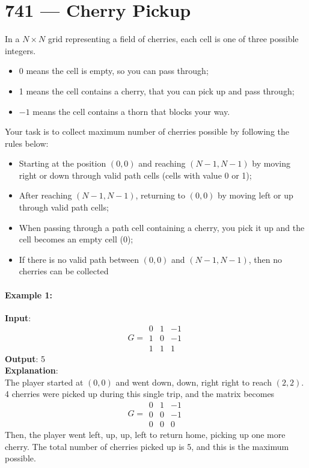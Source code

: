 \section{741 --- Cherry Pickup}
In a $N \times N$ grid representing a field of cherries, each cell is one of three possible integers.
\begin{itemize}
    \item 0 means the cell is empty, so you can pass through;
    \item 1 means the cell contains a cherry, that you can pick up and pass through;
    \item $-1$ means the cell contains a thorn that blocks your way.
\end{itemize}
Your task is to collect maximum number of cherries possible by following the rules below:
\begin{itemize}
    \item Starting at the position $(0, 0)$ and reaching $(N-1, N-1)$ by moving right or down through valid path cells (cells with value 0 or 1);
    \item After reaching $(N-1, N-1)$, returning to $(0, 0)$ by moving left or up through valid path cells;
    \item When passing through a path cell containing a cherry, you pick it up and the cell becomes an empty cell (0);
    \item If there is no valid path between $(0, 0)$ and $(N-1, N-1)$, then no cherries can be collected
\end{itemize}
\paragraph{Example 1:}
\begin{flushleft}
\textbf{Input}:
\[
G = \begin{array}{rrr}
0 & 1 &  -1 \\
1 & 0 & -1 \\
1 & 1 & 1
\end{array}
\]
\textbf{Output}: 5
\\
\textbf{Explanation}:
\\
The player started at $(0, 0)$ and went down, down, right right to reach $(2, 2)$.
\\
4 cherries were picked up during this single trip, and the matrix becomes
\[
G = \begin{array}{rrr}
0 & 1 &  -1 \\
0 & 0 & -1 \\
0 & 0 & 0
\end{array}
\]
Then, the player went left, up, up, left to return home, picking up one more cherry.
The total number of cherries picked up is 5, and this is the maximum possible.
\end{flushleft}
